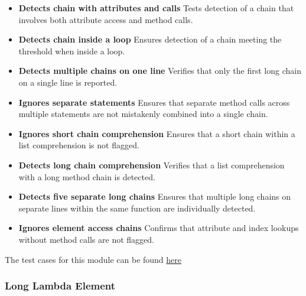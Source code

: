 \documentclass[12pt, titlepage]{article}
\begin{document}
\begin{enumerate}[label={\bf \textcolor{Maroon}{test-SRT-\arabic*}}, wide=0pt, font=\itshape]
\begin{itemize}
    \item \textbf{Detects chain with attributes and calls} \newline
    Tests detection of a chain that involves both attribute access and method calls.
    
    \item \textbf{Detects chain inside a loop} \newline
    Ensures detection of a chain meeting the threshold when inside a loop.
    
    \item \textbf{Detects multiple chains on one line} \newline
    Verifies that only the first long chain on a single line is reported.
    
    \item \textbf{Ignores separate statements} \newline
    Ensures that separate method calls across multiple statements are not mistakenly combined into a single chain.
    
    \item \textbf{Ignores short chain comprehension} \newline
    Ensures that a short chain within a list comprehension is not flagged.
    
    \item \textbf{Detects long chain comprehension} \newline
    Verifies that a list comprehension with a long method chain is detected.
    
    \item \textbf{Detects five separate long chains} \newline
    Ensures that multiple long chains on separate lines within the same function are individually detected.
    
    \item \textbf{Ignores element access chains} \newline
    Confirms that attribute and index lookups without method calls are not flagged.
\end{itemize}

\noindent The test cases for this module can be found \href{https://github.com/ssm-lab/capstone--source-code-optimizer/blob/new-poc/tests/analyzers/test_long_message_chain.py}{here}


\subsubsection{Long Lambda Element}


\end{enumerate}
\end{document}
